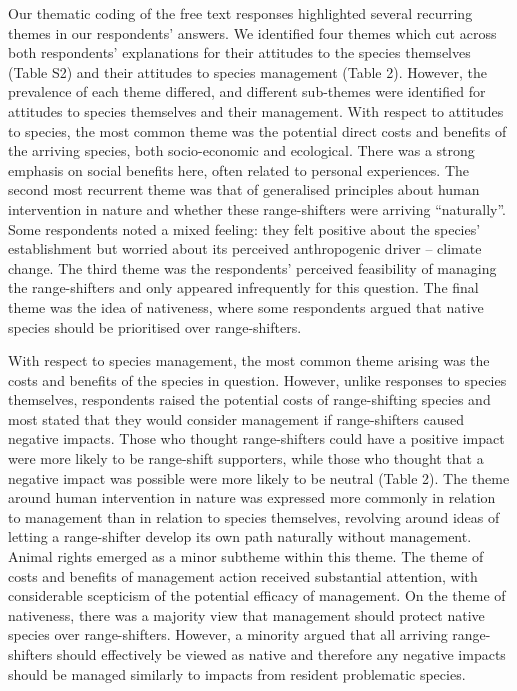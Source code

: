 \documentclass[
]{article}
\begin{document}
Our thematic coding of the free text responses highlighted several
recurring themes in our respondents' answers. We identified four themes
which cut across both respondents' explanations for their attitudes to
the species themselves (Table S2) and their attitudes to species
management (Table 2). However, the prevalence of each theme differed,
and different sub-themes were identified for attitudes to species
themselves and their management. With respect to attitudes to species,
the most common theme was the potential direct costs and benefits of the
arriving species, both socio-economic and ecological. There was a strong
emphasis on social benefits here, often related to personal experiences.
The second most recurrent theme was that of generalised principles about
human intervention in nature and whether these range-shifters were
arriving ``naturally''. Some respondents noted a mixed feeling: they
felt positive about the species' establishment but worried about its
perceived anthropogenic driver -- climate change. The third theme was
the respondents' perceived feasibility of managing the range-shifters
and only appeared infrequently for this question. The final theme was
the idea of nativeness, where some respondents argued that native
species should be prioritised over range-shifters.

With respect to species management, the most common theme arising was
the costs and benefits of the species in question. However, unlike
responses to species themselves, respondents raised the potential costs
of range-shifting species and most stated that they would consider
management if range-shifters caused negative impacts. Those who thought
range-shifters could have a positive impact were more likely to be
range-shift supporters, while those who thought that a negative impact
was possible were more likely to be neutral (Table 2). The theme around
human intervention in nature was expressed more commonly in relation to
management than in relation to species themselves, revolving around
ideas of letting a range-shifter develop its own path naturally without
management. Animal rights emerged as a minor subtheme within this theme.
The theme of costs and benefits of management action received
substantial attention, with considerable scepticism of the potential
efficacy of management. On the theme of nativeness, there was a majority
view that management should protect native species over range-shifters.
However, a minority argued that all arriving range-shifters should
effectively be viewed as native and therefore any negative impacts
should be managed similarly to impacts from resident problematic
species.
\end{document}
